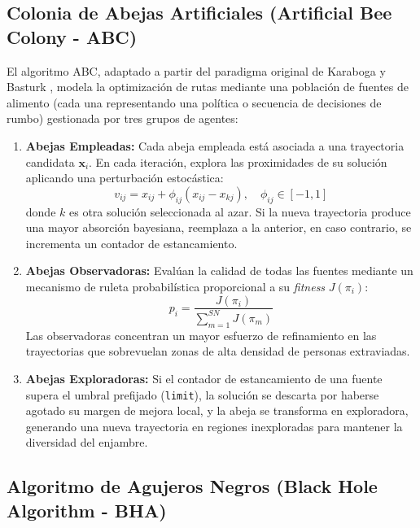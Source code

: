 \subsection{Colonia de Abejas Artificiales (Artificial Bee Colony - ABC)}

El algoritmo ABC, adaptado a partir del paradigma original de Karaboga y Basturk \cite{karaboga2007}, modela la optimización de rutas mediante una población de fuentes de alimento (cada una representando una política o secuencia de decisiones de rumbo) gestionada por tres grupos de agentes:
\begin{enumerate}
    \item \textbf{Abejas Empleadas:} Cada abeja empleada está asociada a una trayectoria candidata $\mathbf{x}_i$. En cada iteración, explora las proximidades de su solución aplicando una perturbación estocástica:
    \begin{equation}
    v_{ij} = x_{ij} + \phi_{ij} (x_{ij} - x_{kj}), \quad \phi_{ij} \in [-1, 1]
    \end{equation}
    donde $k$ es otra solución seleccionada al azar. Si la nueva trayectoria produce una mayor absorción bayesiana, reemplaza a la anterior, en caso contrario, se incrementa un contador de estancamiento.
    \item \textbf{Abejas Observadoras:} Evalúan la calidad de todas las fuentes mediante un mecanismo de ruleta probabilística proporcional a su \textit{fitness} $J(\pi_i)$:
    \begin{equation}
    p_i = \frac{J(\pi_i)}{\sum_{m=1}^{SN} J(\pi_m)}
    \end{equation}
    Las observadoras concentran un mayor esfuerzo de refinamiento en las trayectorias que sobrevuelan zonas de alta densidad de personas extraviadas.
    \item \textbf{Abejas Exploradoras:} Si el contador de estancamiento de una fuente supera el umbral prefijado (\texttt{limit}), la solución se descarta por haberse agotado su margen de mejora local, y la abeja se transforma en exploradora, generando una nueva trayectoria en regiones inexploradas para mantener la diversidad del enjambre.
\end{enumerate}

\subsection{Algoritmo de Agujeros Negros (Black Hole Algorithm - BHA)}

